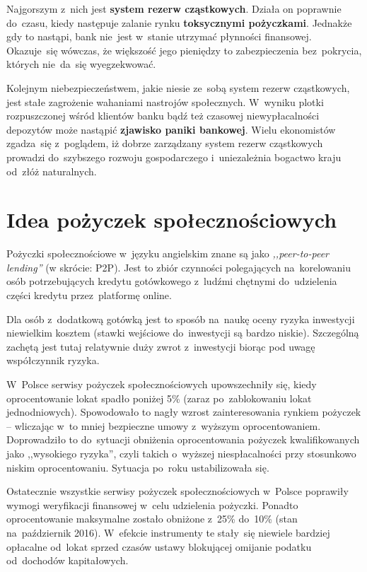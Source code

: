 \documentclass[a4paper,twoside,titlepage,openright]{book}
\begin{document}
Najgorszym z~nich jest \textbf{system rezerw cząstkowych}. Działa on poprawnie do~czasu, kiedy następuje zalanie rynku \textbf{toksycznymi pożyczkami}. Jednakże gdy to nastąpi, bank nie~jest w~stanie utrzymać płynności finansowej. Okazuje~się wówczas, że większość jego pieniędzy to zabezpieczenia bez~pokrycia, których nie~da~się wyegzekwować. 

Kolejnym niebezpieczeństwem, jakie niesie ze~sobą system rezerw cząstkowych, jest stałe zagrożenie wahaniami nastrojów społecznych. W~wyniku plotki rozpuszczonej wśród klientów banku bądź też czasowej niewypłacalności depozytów może nastąpić \textbf{zjawisko paniki bankowej}. Wielu ekonomistów zgadza~się z~poglądem, iż dobrze zarządzany system rezerw cząstkowych prowadzi do~szybszego rozwoju gospodarczego i~uniezależnia bogactwo kraju od~złóż naturalnych.\cite{fractionalReserveBanking}

\section{Idea pożyczek społecznościowych}
Pożyczki społecznościowe w~języku angielskim znane są jako \textit{,,peer-to-peer lending''} (w skrócie: P2P). Jest to zbiór czynności polegających na~korelowaniu osób potrzebujących kredytu gotówkowego z~ludźmi chętnymi do~udzielenia części kredytu przez~platformę online.\cite{P2P} 

Dla osób z~dodatkową gotówką jest to sposób na~naukę oceny ryzyka inwestycji niewielkim kosztem (stawki wejściowe do~inwestycji są bardzo niskie). Szczególną zachętą jest tutaj relatywnie duży zwrot z~inwestycji biorąc pod uwagę współczynnik ryzyka. 

W~Polsce serwisy pożyczek społecznościowych upowszechniły się, kiedy oprocentowanie lokat spadło poniżej 5\% (zaraz po~zablokowaniu lokat jednodniowych).\cite{antybelkowe} Spowodowało to nagły wzrost zainteresowania rynkiem pożyczek -- wliczając w~to mniej bezpieczne umowy z~wyższym oprocentowaniem. Doprowadziło to do~sytuacji obniżenia oprocentowania pożyczek kwalifikowanych jako ,,wysokiego ryzyka'', czyli takich o~wyższej niespłacalności przy stosunkowo niskim oprocentowaniu. Sytuacja po~roku ustabilizowała się. 

Ostatecznie wszystkie serwisy pożyczek społecznościowych w~Polsce poprawiły wymogi weryfikacji finansowej w~celu udzielenia pożyczki. Ponadto oprocentowanie maksymalne zostało obniżone z~25\% do~10\% (stan na~październik 2016). W~efekcie instrumenty te stały~się niewiele bardziej opłacalne od~lokat sprzed czasów ustawy blokującej omijanie podatku od~dochodów kapitałowych.
 
\end{document}
